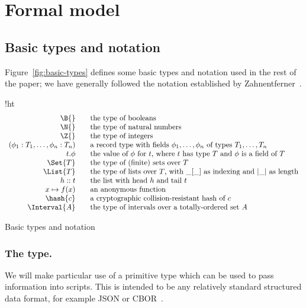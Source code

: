 \section{Formal model}
\label{sec:formal-model}

\subsection{Basic types and notation}
\label{sec:basic-notation}
Figure~\ref{fig:basic-types} defines some basic types and
notation used in the rest of the paper; we have generally followed the
notation established by Zahnentferner~\cite{Zahnentferner18-UTxO}.

\begin{ruledfigure}{!ht}
  \begin{displaymath}
    \begin{array}{rll}
      \B{} && \mbox{the type of booleans}\\
      \N{} && \mbox {the type of natural numbers}\\
      \Z{} && \mbox {the type of integers}\\
      (\phi_1 : T_1, \ldots, \phi_n : T_n) && \mbox{a record type with fields $\phi_1, \ldots, \phi_n$ of types $T_1, \ldots, T_n$}\\
      t.\phi && \mbox{the value of $\phi$ for $t$, where $t$ has type $T$ and
                $\phi$ is a field of $T$}\\
      \Set{T} && \mbox{the type of (finite) sets over $T$}\\
      \List{T} && \mbox{the type of lists over $T$, with $\_[\_]$ as indexing
        and $|\_|$ as length}\\
      h::t && \mbox{the list with head $h$ and tail $t$}\\
      x \mapsto f(x) && \mbox{an anonymous function}\\
      \hash{c} && \mbox{a cryptographic collision-resistant hash of $c$}\\
      \Interval{A} && \mbox{the type of intervals over a totally-ordered set $A$}
    \end{array}
  \end{displaymath}
  \caption{Basic types and notation}
  \label{fig:basic-types}
\end{ruledfigure}

\subsubsection{The \Data{} type.}
\label{sec:data}
We will make particular use of a primitive type \Data{} which can be used to pass information
into scripts. This is intended to be any relatively standard structured
data format, for example JSON or CBOR~\cite{cbor}.

